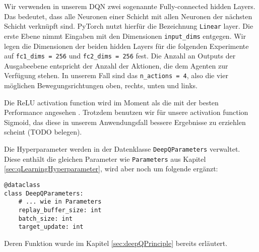 Wir verwenden in unserem DQN zwei sogenannte Fully-connected hidden Layers. Das bedeutet, dass alle Neuronen einer Schicht mit allen Neuronen der nächsten Schicht verknüpft sind. PyTorch nutzt hierfür die Bezeichnung \texttt{Linear} layer. Die erste Ebene nimmt Eingaben mit den Dimensionen \texttt{input_dims} entgegen. Wir legen die Dimensionen der beiden hidden Layers für die folgenden Experimente auf \texttt{fc1_dims = 256} und \texttt{fc2_dims = 256} fest. Die Anzahl an Outputs der Ausgabeebene entspricht der Anzahl der Aktionen, die dem Agenten zur Verfügung stehen. In unserem Fall sind das \texttt{n_actions = 4}, also die vier möglichen Bewegungsrichtungen oben, rechts, unten und links.

Die ReLU activation function wird im Moment als die mit der besten Performance angesehen \cite{10_stevens2020deep}. Trotzdem benutzen wir für unsere activation function Sigmoid, das diese in unserem Anwendungsfall bessere Ergebnisse zu erziehlen scheint (TODO belegen). 

Die Hyperparameter werden in der Datenklasse \texttt{DeepQParameters} verwaltet. Diese enthält die gleichen Parameter wie \texttt{Parameters} aus Kapitel \ref{sec:qLearningHyperparameter}, wird aber noch um folgende ergänzt:
\begin{verbatim}
@dataclass
class DeepQParameters:
    # ... wie in Parameters
    replay_buffer_size: int
    batch_size: int
    target_update: int
\end{verbatim}
Deren Funktion wurde im Kapitel \ref{sec:deepQPrinciple} bereits erläutert.